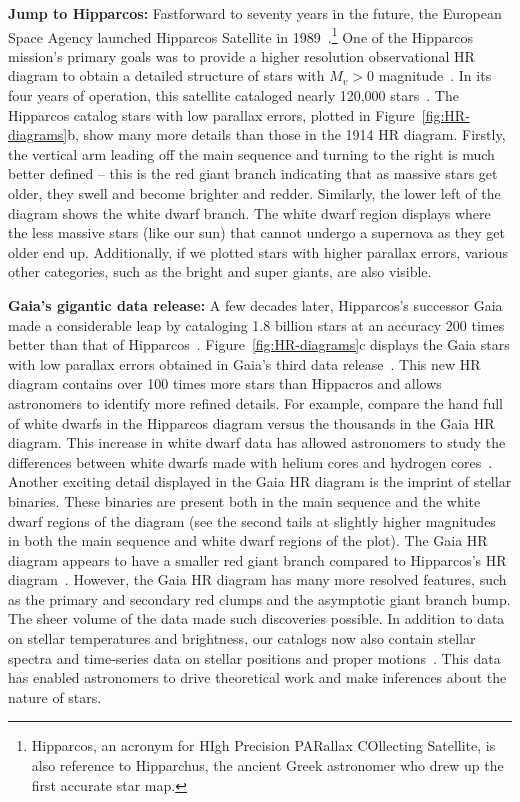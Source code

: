 \textbf{Jump to Hipparcos:}
Fastforward to seventy years in the future, the European Space Agency launched Hipparcos Satellite in 1989~\cite{HIPPARCOS}.\footnote{Hipparcos, an acronym for HIgh Precision PARallax COllecting Satellite, is also reference to Hipparchus, the ancient Greek astronomer who drew up the first accurate star map.}
One of the Hipparcos mission's primary goals was to provide a higher resolution observational HR diagram to obtain a detailed structure of stars with $M_v>0$ magnitude~\cite{HIPPARCOS}. 
In its four years of operation, this satellite cataloged nearly 120,000 stars~\cite{HIPPARCOS}. 
The Hipparcos catalog stars with low parallax errors, plotted in Figure~\ref{fig:HR-diagrams}b,  show many more details than those in the 1914 HR diagram. 
Firstly, the vertical arm leading off the main sequence and turning to the right is much better defined -- this is the red giant branch indicating that as massive stars get older, they swell and become brighter and redder.
Similarly, the lower left of the diagram shows the white dwarf branch. 
The white dwarf region displays where the less massive stars (like our sun) that cannot undergo a supernova as they get older end up. 
Additionally, if we plotted stars with higher parallax errors, various other categories, such as the bright and super giants, are also visible.


\textbf{Gaia's gigantic data release:}
A few decades later, Hipparcos's successor Gaia made a considerable leap by cataloging 1.8 billion stars at an accuracy 200 times better than that of Hipparcos~\cite{GaiaMission, GaiaEDR3}. 
Figure~\ref{fig:HR-diagrams}c displays the Gaia stars with low parallax errors obtained in Gaia's third data release~\cite{GaiaEDR3}. 
This new HR diagram contains over 100 times more stars than Hippacros and allows astronomers to identify more refined details. 
For example, compare the hand full of white dwarfs in the Hipparcos diagram versus the thousands in the Gaia HR diagram.
This increase in white dwarf data has allowed astronomers to study the differences between white dwarfs made with helium cores and hydrogen cores~\cite{GaiaCollaboration:2018:AA}. 
Another exciting detail displayed in the Gaia HR diagram is the imprint of stellar binaries.
These binaries are present both in the main sequence and the white dwarf regions of the diagram (see the second tails at slightly higher magnitudes in both the main sequence and white dwarf regions of the plot).
The Gaia HR diagram appears to have a smaller red giant branch compared to Hipparcos's HR diagram~\cite{GaiaCollaboration:2018:AA}. 
However, the Gaia HR diagram has many more resolved features, such as the primary and secondary red clumps and the asymptotic giant branch bump. 
The sheer volume of the data made such discoveries possible. 
In addition to data on stellar temperatures and brightness, our catalogs now also contain stellar spectra and time-series data on stellar positions and proper motions~\cite{GaiaEDR3}.
This data has enabled astronomers to drive theoretical work and make inferences about the nature of stars.

